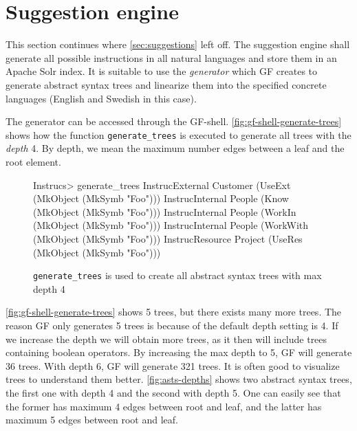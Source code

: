 \section{Suggestion engine}
This section continues where \autoref{sec:suggestions} left off. The suggestion engine shall generate all possible instructions in all natural languages and store them in an Apache Solr index. It is suitable to use the \emph{generator} which GF creates to generate abstract syntax trees and linearize them into the specified concrete languages (English and Swedish in this case).

The generator can be accessed through the GF-shell.  \autoref{fig:gf-shell-generate-trees} shows how the function \texttt{generate\_trees} is executed to generate all trees with the \emph{depth} 4. By depth, we mean the maximum number edges between a leaf and the root element.

\begin{figure}[H]
\begin{terminal}
Instrucs> generate_trees
InstrucExternal Customer (UseExt (MkObject (MkSymb "Foo")))
InstrucInternal People (Know (MkObject (MkSymb "Foo")))
InstrucInternal People (WorkIn (MkObject (MkSymb "Foo")))
InstrucInternal People (WorkWith (MkObject (MkSymb "Foo")))
InstrucResource Project (UseRes (MkObject (MkSymb "Foo")))
\end{terminal}
\caption{\texttt{generate\_trees} is used to create all abstract syntax trees with max depth 4\label{fig:gf-shell-generate-trees}}
\end{figure}

\autoref{fig:gf-shell-generate-trees} shows 5 trees, but there exists many more trees. The reason GF only generates 5 trees is because of the default depth setting is 4. If we increase the depth we will obtain more trees, as it then will include trees containing boolean operators. By increasing the max depth to 5, GF will generate 36 trees. With depth 6, GF will generate 321 trees.
\newline
\newline
It is often good to visualize trees to understand them better. \autoref{fig:asts-depths} shows two abstract syntax trees, the first one with depth 4 and the second with depth 5. One can easily see that the former has maximum 4 edges between root and leaf, and the latter has maximum 5 edges between root and leaf.

